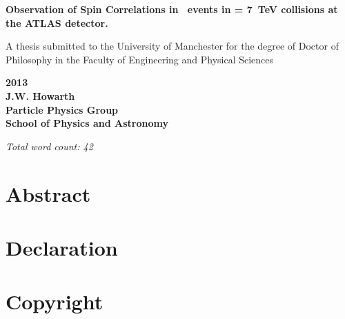 \documentclass[12pt]{report}
\begin{document}
\begin{titlepage}
\setcounter{page}{1}


\begin{center}
\huge
{\bf
Observation of Spin Correlations in \ttbar\ events in  = 7~TeV collisions at the ATLAS detector.
}

\vspace*{2.cm}

\normalsize
A thesis submitted to the University of Manchester for
the degree of Doctor of Philosophy in the Faculty of
Engineering and Physical Sciences

\vspace*{2.cm}

\large
{ \bf
2013\\
\vspace{2.cm}
J.W. Howarth\\
\vspace{1.cm}
Particle Physics Group\\
School of Physics and Astronomy\\
}
\end{center}\end{titlepage}

\setcounter{page}{2}
\singlespacing
\tableofcontents
\onehalfspacing
\begin{center}
{\it Total word count: 42}
\end{center}

\clearpage
\onehalfspacing
\onehalfspacing


\clearpage
\chapter*{Abstract}


\chapter*{Declaration}


\chapter*{Copyright}

\end{document}
